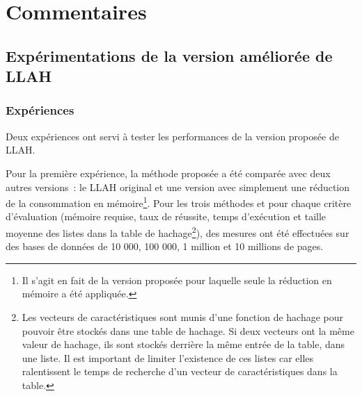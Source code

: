\documentclass[a4paper]{article}
\begin{document}
\section{Commentaires}

\subsection{Expérimentations de la version améliorée de LLAH}

\subsubsection{Expériences}
Deux expériences ont servi à tester les performances de la version proposée de LLAH.

Pour la première expérience, la méthode proposée a été comparée avec deux autres versions~: le LLAH original et une version avec simplement une réduction de la consommation en mémoire\footnote{Il s'agit en fait de la version proposée pour laquelle seule la réduction en mémoire a été appliquée.}. Pour les trois méthodes et pour chaque critère d'évaluation (mémoire requise, taux de réussite, temps d'exécution et taille moyenne des listes dans la table de hachage\footnote{Les vecteurs de caractéristiques sont munis d'une fonction de hachage pour pouvoir être stockés dans une table de hachage. Si deux vecteurs ont la même valeur de hachage, ils sont stockés derrière la même entrée de la table, dans une liste. Il est important de limiter l'existence de ces listes car elles ralentissent le temps de recherche d'un vecteur de caractéristiques dans la table.}), des mesures ont été effectuées sur des bases de données de 10 000, 100 000, 1 million et 10 millions de pages.
\end{document}
